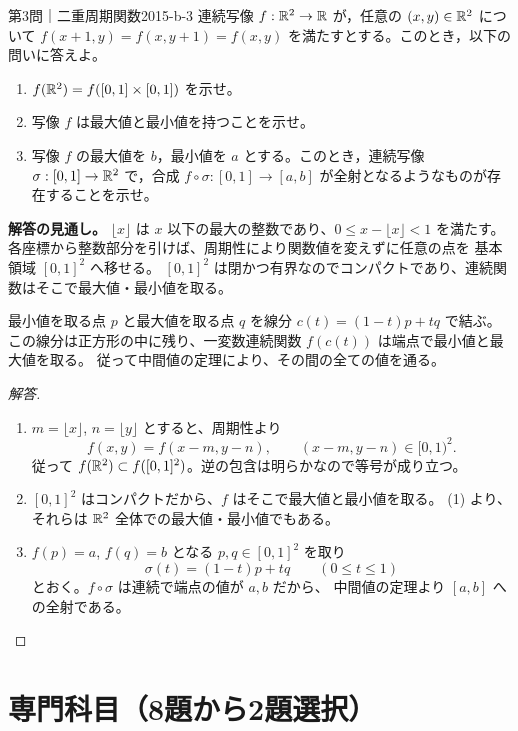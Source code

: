 \begin{problem}{第3問｜二重周期関数}{2015-b-3}
連続写像 $f:\mathbb{R}^2\to\mathbb{R}$ が，任意の $(x,y)\in\mathbb{R}^2$ について
$f(x+1,y)=f(x,y+1)=f(x,y)$ を満たすとする。このとき，以下の問いに答えよ。
\begin{enumerate}
  \item[(1)] $f(\mathbb{R}^2)=f([0,1]\times[0,1])$ を示せ。
  \item[(2)] 写像 $f$ は最大値と最小値を持つことを示せ。
  \item[(3)] 写像 $f$ の最大値を $b$，最小値を $a$ とする。このとき，連続写像 $\sigma:[0,1]\to\mathbb{R}^2$ で，合成 $f\circ\sigma:[0,1]\to[a,b]$ が全射となるようなものが存在することを示せ。
\end{enumerate}
\end{problem}
\begin{memo*}
\textbf{解答の見通し。}
$\lfloor x\rfloor$ は $x$ 以下の最大の整数であり、$0\le x-\lfloor x\rfloor<1$ を満たす。
各座標から整数部分を引けば、周期性により関数値を変えずに任意の点を
基本領域 $[0,1]^2$ へ移せる。
$[0,1]^2$ は閉かつ有界なのでコンパクトであり、連続関数はそこで最大値・最小値を取る。

最小値を取る点 $p$ と最大値を取る点 $q$ を線分 $c(t)=(1-t)p+tq$ で結ぶ。
この線分は正方形の中に残り、一変数連続関数 $f(c(t))$ は端点で最小値と最大値を取る。
従って中間値の定理により、その間の全ての値を通る。
\end{memo*}
\begin{proof}[解答]
\begin{enumerate}
  \item[(1)] $m=\lfloor x\rfloor$, $n=\lfloor y\rfloor$ とすると、周期性より
  \[
  f(x,y)=f(x-m,y-n),\qquad (x-m,y-n)\in[0,1)^2.
  \]
  従って $f(\mathbb{R}^2)\subset f([0,1]^2)$。逆の包含は明らかなので等号が成り立つ。

  \item[(2)] $[0,1]^2$ はコンパクトだから、$f$ はそこで最大値と最小値を取る。
  (1) より、それらは $\mathbb{R}^2$ 全体での最大値・最小値でもある。

  \item[(3)] $f(p)=a$, $f(q)=b$ となる $p,q\in[0,1]^2$ を取り
  \[
  \sigma(t)=(1-t)p+tq\qquad(0\le t\le1)
  \]
  とおく。$f\circ\sigma$ は連続で端点の値が $a,b$ だから、
  中間値の定理より $[a,b]$ への全射である。
\end{enumerate}
\end{proof}

\section{専門科目（8題から2題選択）}

